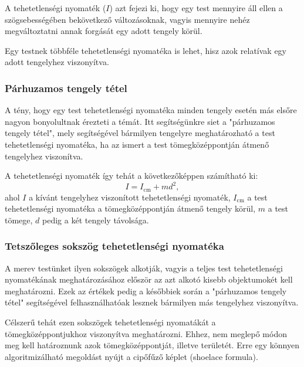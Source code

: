 \documentclass[12pt]{report}
\begin{document}
A tehetetlenségi nyomaték ($I$) azt fejezi ki, hogy egy test mennyire áll ellen a szögsebességében bekövetkező változásoknak, vagyis mennyire nehéz megváltoztatni annak forgását egy adott tengely körül.

Egy testnek többféle tehetetlenségi nyomatéka is lehet, hisz azok relatívak egy adott tengelyhez viszonyítva.

\subsubsection{Párhuzamos tengely tétel}

A tény, hogy egy test tehetetlenségi nyomatéka minden tengely esetén más elsőre nagyon bonyolultnak érezteti a témát. Itt segítségünkre siet a "párhuzamos tengely tétel", mely segítségével bármilyen tengelyre meghatározható a test tehetetlenségi nyomatéka, ha az ismert a test tömegközéppontján átmenő tengelyhez viszonítva.

A tehetetlenségi nyomaték így tehát a következőképpen számítható ki:
\[
    I = I_{\text{cm}} + md^2,
\]
ahol $I$ a kívánt tengelyhez viszonított tehetetlenségi nyomaték, $I_{\text{cm}}$ a test tehetetlenségi nyomatéka a tömegközéppontján átmenő tengely körül, $m$ a test tömege, $d$ pedig a két tengely távolsága.

\subsubsection{Tetszőleges sokszög tehetetlenségi nyomatéka}

A merev testünket ilyen sokszögek alkotják, vagyis a teljes test tehetetlenségi nyomatékának meghatározásához először az azt alkotó kisebb objektumokét kell meghatározni. Ezek az értékek pedig a későbbiek során a "párhuzamos tengely tétel" segítségével felhasználhatóak lesznek bármilyen más tengelyhez viszonyítva.

Célszerű tehát ezen sokszögek tehetetlenségi nyomatákát a tömegközéppontjukhoz viszonyítva meghatározni. Ehhez, nem meglepő módon meg kell határoznunk azok tömegközéppontját, illetve területét. Erre egy könnyen algoritmizálható megoldást nyújt a cipőfűző képlet (shoelace formula).
\end{document}
